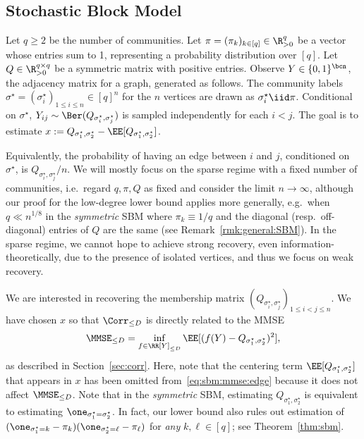 \documentclass[11pt]{article}
\begin{document}
\subsection{Stochastic Block Model}
\label{sec:main-sbm}

\begin{definition}
\label{def:sbm}
Let $q\geq 2$ be the number of communities. Let $\pi=(\pi_k)_{k\in [q]}\in \R_{> 0}^q$ be a vector whose entries sum to 1, representing a probability distribution over $[q]$. Let $Q\in \R_{>0}^{q\times q}$ be a symmetric matrix with positive entries. Observe $Y \in \{0,1\}^{\bcn}$, the adjacency matrix for a graph, generated as follows. The community labels $\sigma^\star=(\sigma^\star_i)_{1\le i\le n}\in [q]^n$ for the $n$ vertices are drawn as $\sigma^\star_i\iid \pi$. Conditional on $\sigma^\star$, $Y_{ij}\sim \Ber(Q_{\sigma^\star_i,\sigma^\star_j})$ is sampled independently for each $i<j$. The goal is to estimate $x := Q_{\sigma^\star_1,\sigma^\star_2}-\EE[Q_{\sigma^\star_1,\sigma^\star_2}]$.
\end{definition}

\noindent Equivalently, the probability of having an edge between $i$ and $j$, conditioned on $\sigma^\star$, is $Q_{\sigma_i^\star,\sigma_j^\star}/n$. We will mostly focus on the sparse regime with a fixed number of communities, i.e.\ regard $q, \pi,Q$ as fixed and consider the limit $n\to\infty$, although our proof for the low-degree lower bound applies more generally, e.g.\ when $q\ll n^{1/8}$ in the \emph{symmetric} SBM where $\pi_k\equiv 1/q$ and the diagonal (resp.\ off-diagonal) entries of $Q$ are the same (see Remark~\ref{rmk:general:SBM}). In the sparse regime, we cannot hope to achieve strong recovery, even information-theoretically, due to the presence of isolated vertices, and thus we focus on weak recovery.

We are interested in recovering the membership matrix $(Q_{\sigma^\star_i,\sigma^\star_j})_{1 \le i < j \le n}$. We have chosen $x$ so that $\Corr_{\le D}$ is directly related to the MMSE
\begin{equation}\label{eq:sbm:mmse:edge}
\MMSE_{\le D} = \inf_{f \in \RR[Y]_{\leq D}} \EE[(f(Y)-Q_{\sigma^\star_1,\sigma^\star_2})^2],
\end{equation}
as described in Section~\ref{sec:corr}. Here, note that the centering term $\EE[Q_{\sigma^\star_1,\sigma^\star_2}]$ that appears in $x$ has been omitted from~\eqref{eq:sbm:mmse:edge} because it does not affect $\MMSE_{\le D}$. Note that in the \emph{symmetric} SBM, estimating $Q_{\sigma^\star_1,\sigma^\star_2}$ is equivalent to estimating $\one_{\sigma^\star_1=\sigma^\star_2}$. In fact, our lower bound also rules out estimation of $(\one_{\sigma^\star_1=k}-\pi_k)(\one_{\sigma^\star_2=\ell}-\pi_\ell)$ for \emph{any} $k,\ell\in[q]$; see Theorem~\ref{thm:sbm}.
\end{document}
